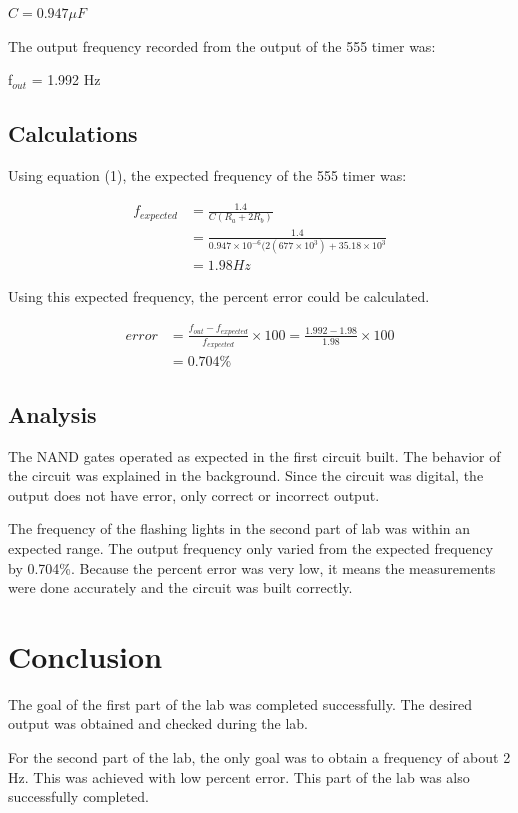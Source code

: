 \documentclass[twocolumn, amsmath]{revtex4}
\begin{document}
\noindent $C = 0.947 \mu F$

The output frequency recorded from the output of the 555 timer was:

f$_{out}$ = 1.992 Hz


\subsection{Calculations}

Using equation (1), the expected frequency of the 555 timer was:

\begin{equation*}\label{eq:pareto mle2}
\begin{aligned}
f_{expected} &= \frac{1.4}{C(R_a + 2R_b)}\\ &= \frac{1.4}{0.947\times 10^{-6}(2(677\times 10^3) + 35.18\times 10^3}\\ &= 1.98 Hz
\end{aligned}
\end{equation*}

\noindent Using this expected frequency, the percent error could be calculated.

\begin{equation*}\label{eq:pareto mle2}
\begin{aligned}
error &= \frac{f_{out} - f_{expected}}{f_{expected}}\times100 = \frac{1.992 - 1.98}{1.98}\times100 \\ &= 0.704\%
\end{aligned}
\end{equation*}


\subsection{Analysis}

The NAND gates operated as expected in the first circuit built. The behavior of the circuit was explained in the background. Since the circuit was digital, the output does not have error, only correct or incorrect output.

The frequency of the flashing lights in the second part of lab was within an expected range. The output frequency only varied from the expected frequency by 0.704\%. Because the percent error was very low, it means the measurements were done accurately and the circuit was built correctly.


\section{Conclusion}

The goal of the first part of the lab was completed successfully. The desired output was obtained and checked during the lab.

For the second part of the lab, the only goal was to obtain a frequency of about 2 Hz. This was achieved with low percent error. This part of the lab was also successfully completed.
\end{document}
